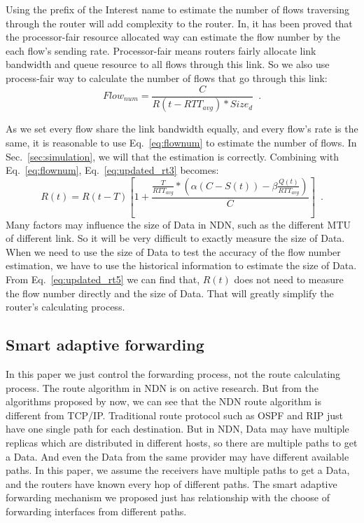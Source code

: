 Using the prefix of the Interest name to estimate the number of flows traversing through the router will add complexity to the router. In\cite{RCP}, it has been proved that the processor-fair resource allocated way can estimate the flow number by the each flow's sending rate. Processor-fair means routers fairly allocate link bandwidth and queue resource to all flows through this link. So we also use process-fair way to calculate the number of flows that go through this link:
\begin{equation}
	\label{eq:flownum}
	Flow_{num}=\frac{C}{R(t-RTT_{avg})\ast{Size_{d}}} \enspace .
\end{equation}

As we set every flow share the link bandwidth equally, and every flow's rate is the same, it is reasonable to use Eq.~\ref{eq:flownum} to estimate the number of flows. In Sec.~\ref{sec:simulation}, we will  that the estimation is correctly.
Combining with Eq.~\ref{eq:flownum}, Eq.~\ref{eq:updated_rt3} becomes:
\begin{equation}
	\label{eq:updated_rt5}
	R(t)=R(t-T)[1+\frac{\frac{T}{RTT_{avg}}\ast(\alpha(C-S(t))-\beta\frac{Q(t)}{RTT_{avg}})}{C}] \enspace .
\end{equation}
Many factors may influence the size of Data in NDN, such as the different MTU of different link. So it will be very difficult to exactly measure the size of Data. When we need to use the size of Data to test the accuracy of the flow number estimation, we have to use the historical information to estimate the size of Data. From Eq.~\ref{eq:updated_rt5} we can find that, $R(t)$ does not need to measure the flow number directly and the size of Data. That will greatly simplify the router's calculating process.

\subsection{Smart adaptive forwarding}

In this paper we just control the forwarding process, not the route calculating process. The route algorithm in NDN is on active research. But from the algorithms proposed by now, we can see that the NDN route algorithm is different from TCP/IP\cite{ndnroute}. Traditional route protocol such as OSPF and RIP just have one single path for each destination. But in NDN, Data may have multiple replicas which are distributed in different hosts, so there are multiple paths to get a Data. And even the Data from the same provider may have different available paths. In this paper, we assume the receivers have multiple paths to get a Data, and the routers have known every hop of different paths. The smart adaptive forwarding mechanism we proposed just has relationship with the choose of forwarding interfaces from different paths.

